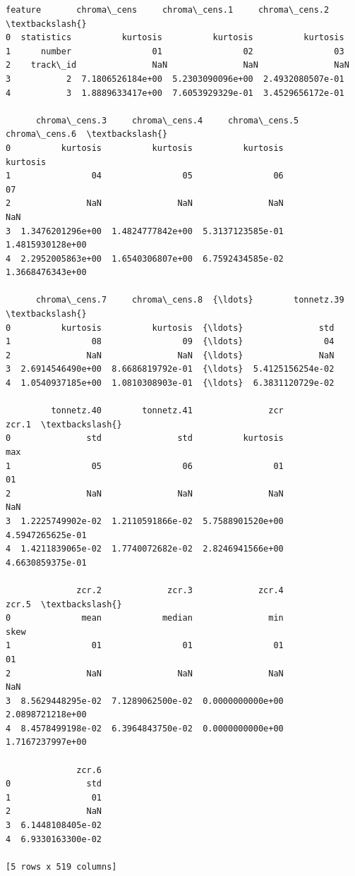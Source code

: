 \documentclass[11pt]{article}
\makeatletter
\newcommand{\boxspacing}{\kern\kvtcb@left@rule\kern\kvtcb@boxsep}
\newcommand{\prompt}[4]{
        {\ttfamily\llap{{\color{#2}[#3]:\hspace{3pt}#4}}\vspace{-\baselineskip}}
    }
\makeatother
\begin{document}
            \begin{tcolorbox}[breakable, size=fbox, boxrule=.5pt, pad at break*=1mm, opacityfill=0]
\prompt{Out}{outcolor}{8}{\boxspacing}
\begin{Verbatim}[commandchars=\\\{\}]
      feature       chroma\_cens     chroma\_cens.1     chroma\_cens.2  \textbackslash{}
0  statistics          kurtosis          kurtosis          kurtosis
1      number                01                02                03
2    track\_id               NaN               NaN               NaN
3           2  7.1806526184e+00  5.2303090096e+00  2.4932080507e-01
4           3  1.8889633417e+00  7.6053929329e-01  3.4529656172e-01

      chroma\_cens.3     chroma\_cens.4     chroma\_cens.5     chroma\_cens.6  \textbackslash{}
0          kurtosis          kurtosis          kurtosis          kurtosis
1                04                05                06                07
2               NaN               NaN               NaN               NaN
3  1.3476201296e+00  1.4824777842e+00  5.3137123585e-01  1.4815930128e+00
4  2.2952005863e+00  1.6540306807e+00  6.7592434585e-02  1.3668476343e+00

      chroma\_cens.7     chroma\_cens.8  {\ldots}        tonnetz.39  \textbackslash{}
0          kurtosis          kurtosis  {\ldots}               std
1                08                09  {\ldots}                04
2               NaN               NaN  {\ldots}               NaN
3  2.6914546490e+00  8.6686819792e-01  {\ldots}  5.4125156254e-02
4  1.0540937185e+00  1.0810308903e-01  {\ldots}  6.3831120729e-02

         tonnetz.40        tonnetz.41               zcr             zcr.1  \textbackslash{}
0               std               std          kurtosis               max
1                05                06                01                01
2               NaN               NaN               NaN               NaN
3  1.2225749902e-02  1.2110591866e-02  5.7588901520e+00  4.5947265625e-01
4  1.4211839065e-02  1.7740072682e-02  2.8246941566e+00  4.6630859375e-01

              zcr.2             zcr.3             zcr.4             zcr.5  \textbackslash{}
0              mean            median               min              skew
1                01                01                01                01
2               NaN               NaN               NaN               NaN
3  8.5629448295e-02  7.1289062500e-02  0.0000000000e+00  2.0898721218e+00
4  8.4578499198e-02  6.3964843750e-02  0.0000000000e+00  1.7167237997e+00

              zcr.6
0               std
1                01
2               NaN
3  6.1448108405e-02
4  6.9330163300e-02

[5 rows x 519 columns]
\end{Verbatim}
\end{tcolorbox}
        
\end{document}
